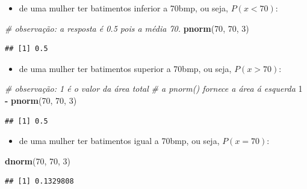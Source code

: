 \documentclass[
]{book}
\newenvironment{Shaded}{\begin{snugshade}}{\end{snugshade}}
\newcommand{\CommentTok}[1]{\textcolor[rgb]{0.56,0.35,0.01}{\textit{#1}}}
\newcommand{\DecValTok}[1]{\textcolor[rgb]{0.00,0.00,0.81}{#1}}
\newcommand{\FunctionTok}[1]{\textcolor[rgb]{0.13,0.29,0.53}{\textbf{#1}}}
\newcommand{\NormalTok}[1]{#1}
\newcommand{\SpecialCharTok}[1]{\textcolor[rgb]{0.81,0.36,0.00}{\textbf{#1}}}
\providecommand{\tightlist}{%
  \setlength{\itemsep}{0pt}\setlength{\parskip}{0pt}}
\begin{document}
\begin{itemize}
\tightlist
\item
  de uma mulher ter batimentos inferior a 70bmp, ou seja, \(P(x<70)\):
\end{itemize}

\begin{Shaded}
\begin{Highlighting}[]
\CommentTok{\# observação: a resposta é 0.5 pois a média 70.}
\FunctionTok{pnorm}\NormalTok{(}\DecValTok{70}\NormalTok{, }\DecValTok{70}\NormalTok{, }\DecValTok{3}\NormalTok{)}
\end{Highlighting}
\end{Shaded}

\begin{verbatim}
## [1] 0.5
\end{verbatim}

\begin{itemize}
\tightlist
\item
  de uma mulher ter batimentos superior a 70bmp, ou seja, \(P(x>70)\):
\end{itemize}

\begin{Shaded}
\begin{Highlighting}[]
\CommentTok{\# observação: 1 é o valor da área total}
\CommentTok{\# a pnorm() fornece a área á esquerda}
\DecValTok{1} \SpecialCharTok{{-}} \FunctionTok{pnorm}\NormalTok{(}\DecValTok{70}\NormalTok{, }\DecValTok{70}\NormalTok{, }\DecValTok{3}\NormalTok{)}
\end{Highlighting}
\end{Shaded}

\begin{verbatim}
## [1] 0.5
\end{verbatim}

\begin{itemize}
\tightlist
\item
  de uma mulher ter batimentos igual a 70bmp, ou seja, \(P(x=70)\):
\end{itemize}

\begin{Shaded}
\begin{Highlighting}[]
\FunctionTok{dnorm}\NormalTok{(}\DecValTok{70}\NormalTok{, }\DecValTok{70}\NormalTok{, }\DecValTok{3}\NormalTok{)}
\end{Highlighting}
\end{Shaded}

\begin{verbatim}
## [1] 0.1329808
\end{verbatim}
\end{document}
